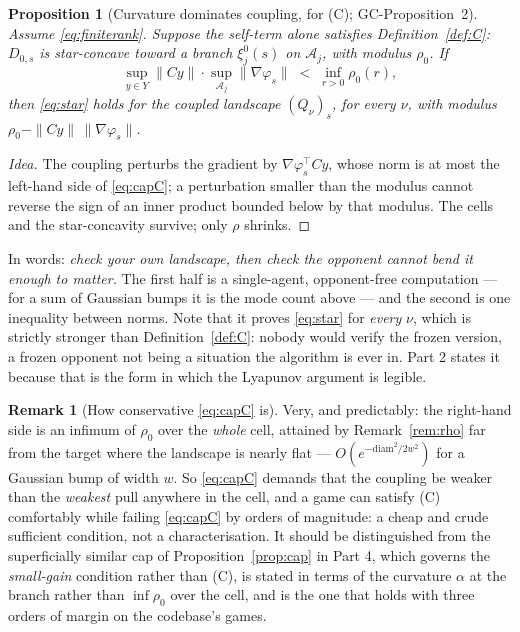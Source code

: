 \documentclass[11pt]{article}
\newtheorem{proposition}[theorem]{Proposition}
\theoremstyle{definition}
\newtheorem{remark}[theorem]{Remark}
\newcommand{\cA}{\mathcal{A}}
\newcommand{\GC}[1]{\textsf{GC-#1}}
\begin{document}
\begin{proposition}[Curvature dominates coupling, for (C); \GC{Proposition~2}]
\label{prop:capC}
Assume \eqref{eq:finiterank}. Suppose the \emph{self-term alone} satisfies
Definition~\ref{def:C}: $D_{0,s}$ is star-concave toward a branch
$\xi^0_j(s)$ on $\cA_j$, with modulus $\rho_0$. If
\begin{equation}\label{eq:capC}
  \sup_{y \in Y}\|Cy\| \cdot \sup_{\cA_j}\|\nabla\varphi_s\|
  \;<\; \inf_{r > 0} \rho_0(r),
\end{equation}
then \eqref{eq:star} holds for the \emph{coupled} landscape $(Q_\nu)_s$, for every
$\nu$, with modulus $\rho_0 - \|Cy\|\,\|\nabla\varphi_s\|$.
\end{proposition}

\begin{proof}[Idea]
The coupling perturbs the gradient by $\nabla\varphi_s^\top Cy$, whose norm is at
most the left-hand side of \eqref{eq:capC}; a perturbation smaller than the
modulus cannot reverse the sign of an inner product bounded below by that modulus.
The cells and the star-concavity survive; only $\rho$ shrinks.
\end{proof}

In words: \emph{check your own landscape, then check the opponent cannot bend it
enough to matter.} The first half is a single-agent, opponent-free computation ---
for a sum of Gaussian bumps it is the mode count above --- and the second is one
inequality between norms. Note that it proves \eqref{eq:star} for \emph{every}
$\nu$, which is strictly stronger than Definition~\ref{def:C}: nobody would verify
the frozen version, a frozen opponent not being a situation the algorithm is ever
in. Part 2 states it because that is the form in which the Lyapunov argument is
legible.

\begin{remark}[How conservative \eqref{eq:capC} is]\label{rem:conservative}
Very, and predictably: the right-hand side is an infimum of $\rho_0$ over the
\emph{whole} cell, attained by Remark~\ref{rem:rho} far from the target where the
landscape is nearly flat --- $O(e^{-\mathrm{diam}^2/2w^2})$ for a Gaussian bump of
width $w$. So \eqref{eq:capC} demands that the coupling be weaker than the
\emph{weakest} pull anywhere in the cell, and a game can satisfy (C) comfortably
while failing \eqref{eq:capC} by orders of magnitude: a cheap and crude sufficient
condition, not a characterisation. It should be distinguished from the
superficially similar cap of Proposition~\ref{prop:cap} in Part 4, which governs
the \emph{small-gain} condition rather than (C), is stated in terms of the
curvature $\alpha$ at the branch rather than $\inf\rho_0$ over the cell, and is
the one that holds with three orders of margin on the codebase's games.
\end{remark}
\end{document}
